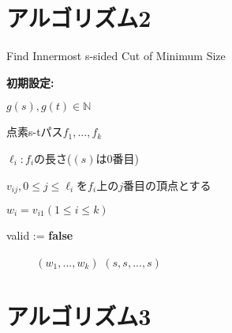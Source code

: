 \documentclass{jarticle}
\theoremstyle{definition}
\begin{document}
\section*{アルゴリズム2}

\begin{algorithm}[H]
    \caption{Find Innermost s-sided Cut of Minimum Size} 
    \textbf{初期設定:} \par
    $g(s),g(t)\in \mathbb{N}$ \par
    点素s-tパス$f_1,...,f_k$ \par
    $\ell_i:f_i$の長さ($(s)$は0番目) \par
    $v_{ij},0 \leq j \leq \ell_i$を$f_i$上の$j$番目の頂点とする \par
    $w_i=v_{i1}(1\leq i \leq k)$ \par
    valid := \textbf{false} \par 
    {\setlength{\baselineskip}{10pt}
    \begin{algorithmic}[1]
         
         
             
             
            \Else
            \EndIf　
        \EndWhile　
      \EndFor
       $(w_1,...,w_k)$
      \Else
       $(s,s,...,s)$
      \EndIf
    \end{algorithmic}
    }
\end{algorithm}

\section*{アルゴリズム3}
\end{document}
